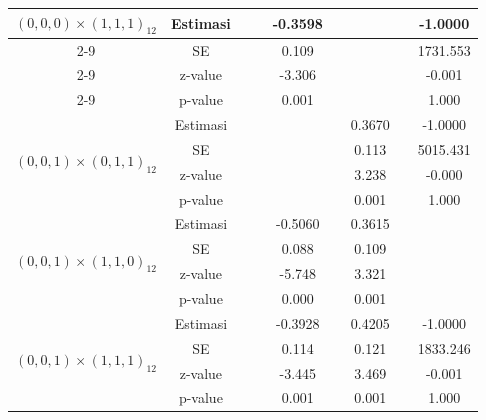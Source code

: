 \begin{enumerate}[label=\alph*.]
\begin{longtable}{|c|c|c|c|c|c|c|c|c|}
            \multirow{4}{*}{$(0,0,0)\times(1,1,1)_{12}$}
            & Estimasi & {} & {} & -0.3598 & {} & {} & {} & -1.0000\\ \cline{2-9}
            & SE       & {} & {} & 0.109 & {} & {} & {} & 1731.553\\ \cline{2-9}
            & z-value  & {} & {} & -3.306 & {}   & {}   & {} & -0.001\\ \cline{2-9}
            & p-value  & {} & {} & 0.001 & {} & {} & {} & 1.000\\ \hline

            \multirow{4}{*}{$(0,0,1)\times(0,1,1)_{12}$}
            & Estimasi & {} & {} & {} & {} & 0.3670 & {} & -1.0000 \\ \cline{2-9}
            & SE       & {} & {} & {} & {} & 0.113 & {} & 5015.431\\ \cline{2-9}
            & z-value  & {} & {} & {} & {} & 3.238 & {} & -0.000\\ \cline{2-9}
            & p-value  & {} & {} & {} & {} & 0.001 & {} & 1.000\\ \hline

            \multirow{4}{*}{$(0,0,1)\times(1,1,0)_{12}$}
            & Estimasi & {} & {} & -0.5060 & {}  & 0.3615 & {} & {}\\ \cline{2-9}
            & SE       & {} & {} & 0.088 & {} & 0.109 & {} & {}\\ \cline{2-9}
            & z-value  & {} & {} & -5.748 & {} & 3.321 & {} & {}\\ \cline{2-9}
            & p-value  & {} & {} & 0.000 & {} & 0.001 & {} & {} \\ \hline

            \multirow{4}{*}{$(0,0,1)\times(1,1,1)_{12}$}
            & Estimasi & {} & {} & -0.3928 & {} & 0.4205 & {} & -1.0000 \\ \cline{2-9}
            & SE       & {} & {} & 0.114   & {} & 0.121 & {} & 1833.246\\ \cline{2-9}
            & z-value  & {} & {} & -3.445  & {} & 3.469 & {} & -0.001\\ \cline{2-9}
            & p-value  & {} & {} & 0.001   & {} & 0.001 & {} & 1.000 \\ \hline


\end{longtable}
\end{enumerate}
